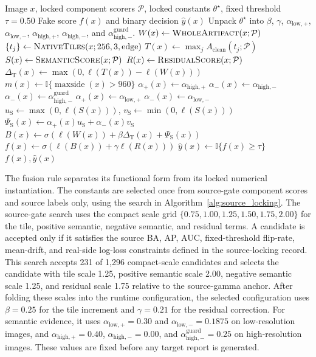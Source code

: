 \documentclass[letterpaper,journal]{IEEEtran}
\begin{document}
\begin{algorithm}[!t]
\caption{Locked multi-prior scoring}
\label{alg:locked_inference}
\begin{algorithmic}[1]
\REQUIRE Image $x$, locked component scorers $\mathcal{P}$, locked constants $\theta^\star$, fixed threshold $\tau=0.50$
\ENSURE Fake score $f(x)$ and binary decision $\hat{y}(x)$
\STATE Unpack $\theta^\star$ into $\beta$, $\gamma$, $\alpha_{\mathrm{low},+}$, $\alpha_{\mathrm{low},-}$, $\alpha_{\mathrm{high},+}$, $\alpha_{\mathrm{high},-}$, and $\alpha_{\mathrm{high},-}^{\mathrm{guard}}$.
\STATE $W(x)\leftarrow\textsc{WholeArtifact}(x;\mathcal{P})$
\STATE $\{t_j\}\leftarrow\textsc{NativeTiles}(x;256,3,\mathrm{edge})$
\STATE $T(x)\leftarrow\max_j A_{\mathrm{clean}}(t_j;\mathcal{P})$
\STATE $S(x)\leftarrow\textsc{SemanticScore}(x;\mathcal{P})$
\STATE $R(x)\leftarrow\textsc{ResidualScore}(x;\mathcal{P})$
\STATE $\Delta_{\mathrm{T}}(x)\leftarrow\max(0,\ell(T(x))-\ell(W(x)))$
\STATE $m(x)\leftarrow\mathbb{I}\{\operatorname{maxside}(x)>960\}$
    \STATE $\alpha_+(x)\leftarrow\alpha_{\mathrm{high},+}$
        \STATE $\alpha_-(x)\leftarrow\alpha_{\mathrm{high},-}$
    \ELSE
        \STATE $\alpha_-(x)\leftarrow\alpha_{\mathrm{high},-}^{\mathrm{guard}}$
    \ENDIF
\ELSE
    \STATE $\alpha_+(x)\leftarrow\alpha_{\mathrm{low},+}$
    \STATE $\alpha_-(x)\leftarrow\alpha_{\mathrm{low},-}$
\ENDIF
\STATE $u_{\mathrm{S}}\leftarrow\max(0,\ell(S(x)))$, \quad $v_{\mathrm{S}}\leftarrow\min(0,\ell(S(x)))$
\STATE $\Psi_{\mathrm{S}}(x)\leftarrow\alpha_+(x)u_{\mathrm{S}}+\alpha_-(x)v_{\mathrm{S}}$
\STATE $B(x)\leftarrow\sigma(\ell(W(x))+\beta\Delta_{\mathrm{T}}(x)+\Psi_{\mathrm{S}}(x))$
\STATE $f(x)\leftarrow\sigma(\ell(B(x))+\gamma\ell(R(x)))$
\STATE $\hat{y}(x)\leftarrow\mathbb{I}\{f(x)\geq\tau\}$
\RETURN $f(x),\hat{y}(x)$
\end{algorithmic}
\end{algorithm}

The fusion rule separates its functional form from its locked numerical instantiation. The constants are selected once from source-gate component scores and source labels only, using the search in Algorithm~\ref{alg:source_locking}. The source-gate search uses the compact scale grid $\{0.75,1.00,1.25,1.50,1.75,2.00\}$ for the tile, positive semantic, negative semantic, and residual terms. A candidate is accepted only if it satisfies the source BA, AP, AUC, fixed-threshold flip-rate, mean-drift, and real-side log-loss constraints defined in the source-locking record. This search accepts 231 of 1,296 compact-scale candidates and selects the candidate with tile scale 1.25, positive semantic scale 2.00, negative semantic scale 1.25, and residual scale 1.75 relative to the source-gamma anchor. After folding these scales into the runtime configuration, the selected configuration uses $\beta=0.25$ for the tile increment and $\gamma=0.21$ for the residual correction. For semantic evidence, it uses $\alpha_{\mathrm{low},+}=0.30$ and $\alpha_{\mathrm{low},-}=0.1875$ on low-resolution images, and $\alpha_{\mathrm{high},+}=0.40$, $\alpha_{\mathrm{high},-}=0.00$, and $\alpha_{\mathrm{high},-}^{\mathrm{guard}}=0.25$ on high-resolution images. These values are fixed before any target report is generated.
\end{document}
